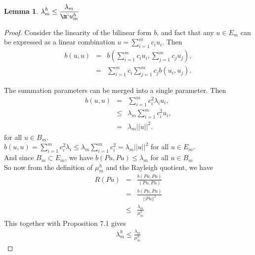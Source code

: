 \documentclass[../../main.tex]{subfiles}
\begin{document}
\newtheorem{Lem_1}{Lemma}
\begin{Lem_1}
	$\displaystyle \lambda_{m}^{h} \leq \frac{\lambda_{m}}{\m`u_{m}^{h}}$
\end{Lem_1}
\begin{proof}
	Consider the linearity of the bilinear form $b$, and fact that any $u \in E_m$ can be expressed as a linear combination $u = \sum_{i=1}^{m} c_{i}u_{i}$. Then
	\begin{eqnarray*}
	b(u,u) &=& b\left(\sum_{i=1}^{m} c_{i}u_{i},\sum_{j=1}^{m} c_{j}u_{j}\right),\\
			&=& \sum_{i=1}^{m} c_{i}\sum_{j=1}^{m} c_{j} b(u_{i},u_{j}).
	\end{eqnarray*}

	The summation parameters can be merged into a single parameter. Then
	\begin{eqnarray*}
		b(u,u)  & = & \sum_{i=1}^{m} c_{i}^{2} \lambda_{i} u_i,\\
				& \leq & \lambda_{m}\sum_{i=1}^{m} c_{i}^{2} u_i,\\
				& = & \lambda_{m}||u||^2.
	\end{eqnarray*} for all $u \in B_m$.\\
	
	
	$b(u,u) = \sum_{i=1}^{m} c_{i}^{2} \lambda_{i} \leq \lambda_{m}\sum_{i=1}^{m} c_{i}^{2} =\lambda_{m} ||u||^{2}$ for all $u \in E_{m}$.\\
	And since $B_{m} \subset E_{m}$, we have $b(Pu,Pu) \leq \lambda_{m}$ for all $u\in B_{m}$\\
	
	
	So now from the definition of $\mu_{m}^{h}$ and the Rayleigh quotient, we have
	\begin{eqnarray*}
		R(Pu) &=& \frac{b(Pu,Pu)}{(Pu,Pu)}\\
			&=& \frac{b(Pu,Pu)}{||Pu||^{2}}\\
			&\leq & \frac{\lambda_{m}}{\mu_{m}^{h}}
	\end{eqnarray*}
	This together with Proposition 7.1 gives
	\begin{eqnarray*}
		\lambda_{m}^{h} \leq \frac{\lambda_{m}}{\mu_{m}^{h}}
	\end{eqnarray*}
\end{proof}
\end{document}
